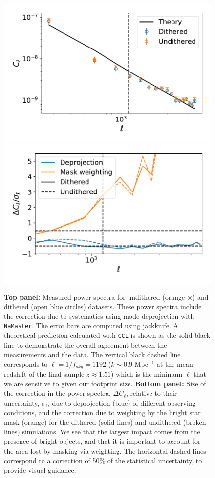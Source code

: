 \documentclass[a4paper,fleqn,usenatbib]{mnras}
\begin{document}
\begin{figure}
\centering
\includegraphics[width=0.9\columnwidth]{Cl_results_2019_comp}
\includegraphics[width=0.9\columnwidth]{systematics_comp_abs}
\caption{{\bf Top panel:} Measured power spectra for undithered (orange $\times$) and dithered (open blue circles) datasets. These power spectra include the correction due to systematics using mode deprojection with \texttt{NaMaster}. The error bars are computed using jackknife. A theoretical prediction calculated with \texttt{CCL} is shown as the solid black line to demonstrate the overall agreement between the measurements and the data. The vertical black dashed line corresponds to $\ell = 1/f_{sky}=1192$ ($k \sim 0.9$ Mpc$^{-1}$ at the mean redshift of the final sample $\bar{z} \approx 1.51$) which is the minimum $\ell$ that we are sensitive to given our footprint size. {\bf Bottom panel:} Size of the correction in the power spectra, $\Delta C_{\ell}$, relative to their uncertainty, $\sigma_{\ell}$, due to deprojection (blue) of different observing conditions, and the correction due to weighting by the bright star mask (orange) for the dithered (solid lines) and undithered (broken lines) simulations. We see that the largest impact comes from the presence of bright objects, and that it is important to account for the area lost by masking via weighting. The horizontal dashed lines correspond to a correction of 50\% of the statistical uncertainty, to provide visual guidance.} 
\label{fig:power_spectra}
\end{figure}
\end{document}
